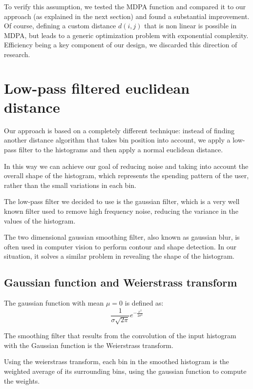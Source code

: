 To verify this assumption, we tested the MDPA function and compared it to our approach (as explained in the next section) and found a substantial improvement. Of course, defining a custom distance $d(i, j)$ that is non linear is possible in MDPA, but leads to a generic optimization problem with exponential complexity. Efficiency being a key component of our design, we discarded this direction of research.

\section{Low-pass filtered euclidean distance}

Our approach is based on a completely different technique: instead of finding another distance algorithm that takes bin position into account, we apply a low-pass filter to the histograms and then apply a normal euclidean distance.

In this way we can achieve our goal of reducing noise and taking into account the overall shape of the histogram, which represents the spending pattern of the user, rather than the small variations in each bin. 

The low-pass filter we decided to use is the gaussian filter, which is a very well known filter used to remove high frequency noise, reducing the variance in the values of the histogram.

The two dimensional gaussian smoothing filter, also known as gaussian blur, is often used in computer vision to perform contour and shape detection. In our situation, it solves a similar problem in revealing the shape of the histogram.

\subsection{Gaussian function and Weierstrass transform}

The gaussian function with mean $\mu = 0$ is defined as:
\begin{displaymath}
  \frac{1}{\sigma\sqrt{2\pi}}e^{-\frac{x^2}{2\sigma^2}}
\end{displaymath}

The smoothing filter that results from the convolution of the input histogram with the Gaussian function is the Weierstrass transform.

Using the weierstrass transform, each bin in the smoothed histogram is the weighted average of its surrounding bins, using the gaussian function to compute the weights.

